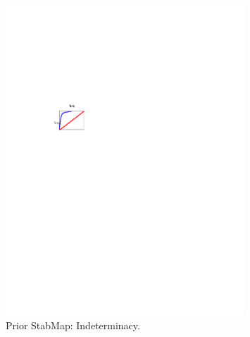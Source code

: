 
\begin{figure}[H]
\centering 
\includegraphics[width=0.8\textwidth]{monetary/gsa/monetary_prior_indeterm}
\caption{Prior StabMap: Indeterminacy.}\label{Fig:monetary_prior_indeterm}
\end{figure}

